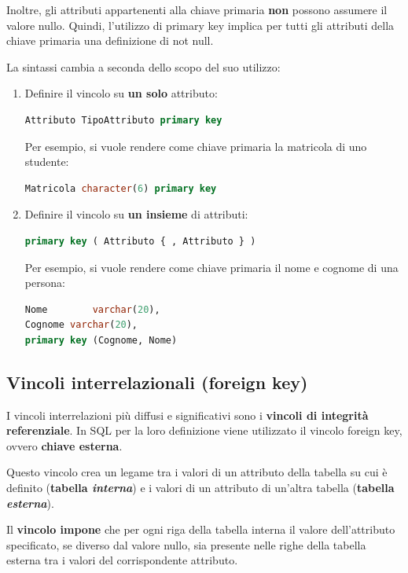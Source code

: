 \documentclass[a4paper]{article}
\begin{document}
	Inoltre, gli attributi appartenenti alla chiave primaria \textbf{non} possono assumere il valore nullo. Quindi, l'utilizzo di \textsf{primary key} implica per tutti gli attributi della chiave primaria una definizione di \textsf{not null}.\newline

	\noindent
	\noindent
	La sintassi cambia a seconda dello scopo del suo utilizzo:
	\begin{enumerate}
		\item Definire il vincolo su \textbf{un solo} attributo:
\begin{lstlisting}[language=SQL]
Attributo TipoAttributo primary key\end{lstlisting}
		Per esempio, si vuole rendere come chiave primaria la matricola di uno studente:
\begin{lstlisting}[language=SQL]
Matricola character(6) primary key\end{lstlisting}

		\item Definire il vincolo su \textbf{un insieme} di attributi:
\begin{lstlisting}[language=SQL]
primary key ( Attributo { , Attributo } )\end{lstlisting}
		Per esempio, si vuole rendere come chiave primaria il nome e cognome di una persona:
\begin{lstlisting}[language=SQL]
Nome 		varchar(20),
Cognome varchar(20),
primary key (Cognome, Nome)\end{lstlisting}
	\end{enumerate}\newpage

	\subsection{Vincoli interrelazionali (\textsf{foreign key})}
	
	I vincoli interrelazioni più diffusi e significativi sono i \textbf{vincoli di integrità referenziale}. In SQL per la loro definizione viene utilizzato il vincolo \textsf{foreign key}, ovvero \textbf{chiave esterna}.\newline
	
	\noindent
	Questo vincolo crea un legame tra i valori di un attributo della tabella su cui è definito (\textbf{tabella \emph{interna}}) e i valori di un attributo di un'altra tabella (\textbf{tabella \emph{esterna}}).
	
	Il \textbf{vincolo impone} che per ogni riga della tabella interna il valore dell'attributo specificato, se diverso dal valore nullo, sia presente nelle righe della tabella esterna tra i valori del corrispondente attributo.
	
\end{document}
